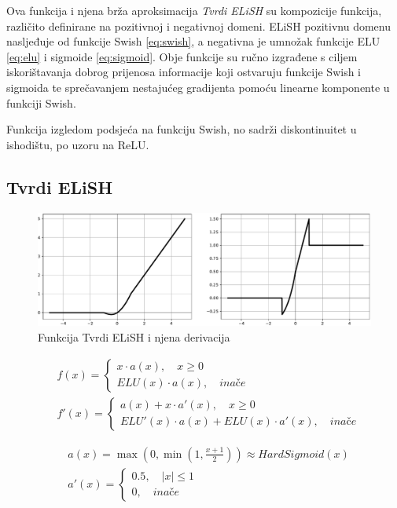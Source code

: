 \documentclass[times, utf8, numeric, diplomski]{fer}
\def\otherwise{\textit{inače}}
\begin{document}
Ova funkcija i njena brža aproksimacija \textit{Tvrdi ELiSH} su kompozicije funkcija, različito definirane na pozitivnoj i negativnoj domeni. ELiSH pozitivnu domenu nasljeđuje od funkcije Swish \eqref{eq:swish}, a negativna je umnožak funkcije ELU \eqref{eq:elu} i sigmoide \eqref{eq:sigmoid}. Obje funkcije su ručno izgrađene s ciljem iskorištavanja dobrog prijenosa informacije koji ostvaruju funkcije Swish i sigmoida te sprečavanjem nestajućeg gradijenta pomoću linearne komponente u funkciji Swish. \citep{elish}

Funkcija izgledom podsjeća na funkciju Swish, no sadrži diskontinuitet u ishodištu, po uzoru na ReLU.

\subsection{Tvrdi ELiSH}
\label{func:hard_elish}

\begin{figure}[H]
\includegraphics[width=\textwidth]{func_Hard_ELiSH.pdf}
\centering
\caption{Funkcija Tvrdi ELiSH i njena derivacija}
\label{fig:hard_elish}
\end{figure}

\begin{equation}
\begin{split}
&f(x) =
	\begin{cases}
		x \cdot a(x), \quad x \geq 0 \\
		ELU(x) \cdot a(x), \quad \otherwise
	\end{cases} \\
&f'(x) = \begin{cases}
	a(x) + x \cdot a'(x), \quad x \geq 0 \\
	ELU'(x) \cdot a(x) + ELU(x) \cdot a'(x), \quad \otherwise
\end{cases}
\end{split}
\end{equation}

\begin{equation}
\begin{split}
&a(x) = \max(0, \min(1, \frac{x+1}{2})) \approx HardSigmoid(x) \\
&a'(x) =
\begin{cases}
	0.5, \quad |x| \leq 1 \\
	0, \quad \otherwise
\end{cases}	
\end{split}
\end{equation}
\end{document}
